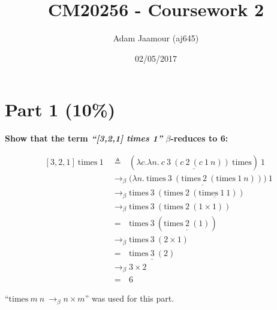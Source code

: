 \documentclass{article}
\title{CM20256 - Coursework 2}
\date{02/05/2017}
\author{Adam Jaamour (aj645)}
\begin{document}

	\newcommand{\lamb}{$\lambda$}
	\newcommand{\la}{\lambda}
	\newcommand{\be}{$\beta$}
	
	\newcommand{\sa}{\quad}
	\newcommand{\saq}{\, \, \, \,}	
	
	\newcommand{\equals}{\rightarrow_\beta}
	\newcommand{\equalsT}{\sa \rightarrow_\beta^*\sa}
	
	\newcommand{\tim}{\text{times}}
	
	
	
	\maketitle
	\newpage
	
	\begin{Large}
		\tableofcontents
	\end{Large}
	\newpage
	
	\pagenumbering{arabic}
	
	
	\section{Part 1 (10\%)}

	\begin{Large}
	
		\textbf{Show that the term \textit{``[3,2,1] times 1''} $\beta$-reduces to 6:}
		
		\begin{align*}
			\saq [3,2,1] \ \tim \ 1 \ &\triangleq \saq (\underline{\la c. \la n . \ c \ 3 \ (c \ 2 \ (c \ 1 \ n)) \ \tim }) \ 1 \\
			&\equals (\underline{ \la n . \ \tim \ 3 \ (\tim \ 2 \ (\tim \ 1 \ n))) \ 1} \\
			&\equals \tim \ 3 \ (\tim \ 2 \ (\underline{\tim \ 1 \ 1})) \\
			&\equals \tim \ 3 \ (\tim \ 2 \ (1 \times 1)) \\
			&= \saq \tim \ 3 \ (\underline{\tim \ 2 \ (1)}) \\
			&\equals \tim \ 3 \ (2 \times 1) \\
			&= \saq \underline{\tim \ 3 \ (2)} \\
			&\equals 3 \times 2 \\
			&= \saq 6
		\end{align*}
		
		``$\tim \ m \ n \ \equals n \times m$'' was used for this part.\\
		\newline
		
	\end{Large}
	
\end{document}
